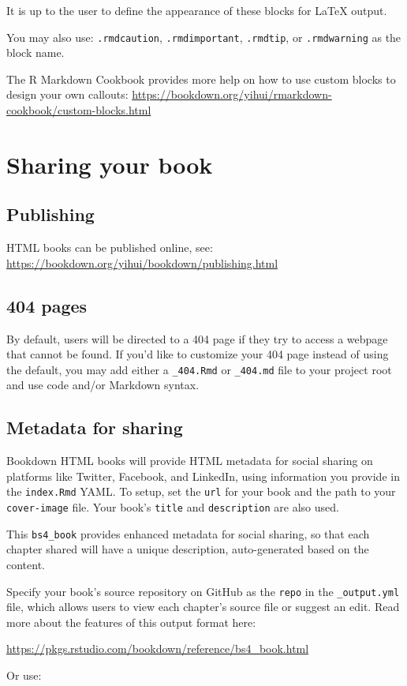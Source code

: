 \documentclass[
  12pt,
  a4paper,
  extrafontsizes,
  onecolumn,
  openright]{book}
\theoremstyle{definition}
\theoremstyle{definition}
\theoremstyle{definition}
\theoremstyle{definition}
\theoremstyle{remark}
\begin{document}
It is up to the user to define the appearance of these blocks for LaTeX output.

You may also use: \texttt{.rmdcaution}, \texttt{.rmdimportant}, \texttt{.rmdtip}, or \texttt{.rmdwarning} as the block name.

The R Markdown Cookbook provides more help on how to use custom blocks to design your own callouts: \url{https://bookdown.org/yihui/rmarkdown-cookbook/custom-blocks.html}

\hypertarget{sharing-your-book}{%
\chapter{Sharing your book}\label{sharing-your-book}}

\hypertarget{publishing}{%
\section{Publishing}\label{publishing}}

HTML books can be published online, see: \url{https://bookdown.org/yihui/bookdown/publishing.html}

\hypertarget{pages}{%
\section{404 pages}\label{pages}}

By default, users will be directed to a 404 page if they try to access a webpage that cannot be found. If you'd like to customize your 404 page instead of using the default, you may add either a \texttt{\_404.Rmd} or \texttt{\_404.md} file to your project root and use code and/or Markdown syntax.

\hypertarget{metadata-for-sharing}{%
\section{Metadata for sharing}\label{metadata-for-sharing}}

Bookdown HTML books will provide HTML metadata for social sharing on platforms like Twitter, Facebook, and LinkedIn, using information you provide in the \texttt{index.Rmd} YAML. To setup, set the \texttt{url} for your book and the path to your \texttt{cover-image} file. Your book's \texttt{title} and \texttt{description} are also used.

This \texttt{bs4\_book} provides enhanced metadata for social sharing, so that each chapter shared will have a unique description, auto-generated based on the content.

Specify your book's source repository on GitHub as the \texttt{repo} in the \texttt{\_output.yml} file, which allows users to view each chapter's source file or suggest an edit. Read more about the features of this output format here:

\url{https://pkgs.rstudio.com/bookdown/reference/bs4_book.html}

Or use:

  
\end{document}
